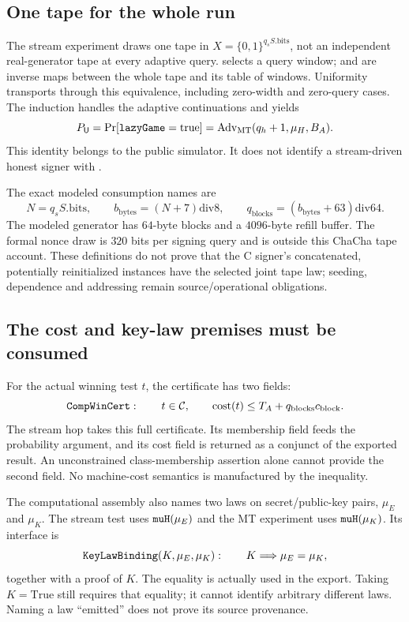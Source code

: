 \subsection{One tape for the whole run}
The stream experiment draws one tape in
$X=\{0,1\}^{q_s S.\mathrm{bits}}$, not an independent real-generator
tape at every adaptive query.  selects a query window;
 and  are inverse maps between
the whole tape and its table of windows. Uniformity transports through
this equivalence, including zero-width and zero-query cases.
The induction  handles the adaptive
continuations and yields
\[
 P_\U=\Pr[\code{lazyGame}=\mathrm{true}]
      =\Adv_{\mathrm{MT}}(q_h+1,\mu_H,B_A).
\]
This identity belongs to the public simulator. It does not identify
a stream-driven honest signer with .

The exact modeled consumption names are
\[
 N=q_s S.\mathrm{bits},\qquad
 b_{\mathrm{bytes}}=(N+7)\mathbin{\mathrm{div}}8,\qquad
 q_{\mathrm{blocks}}=(b_{\mathrm{bytes}}+63)\mathbin{\mathrm{div}}64.
\]
The modeled generator has $64$-byte blocks and a $4096$-byte refill
buffer. The formal nonce draw is $320$ bits per signing query and is
outside this ChaCha tape account. These definitions do not prove that
the C signer's concatenated, potentially reinitialized instances have
the selected joint tape law; seeding, dependence and addressing remain
source/operational obligations.

\subsection{The cost and key-law premises must be consumed}
For the actual winning test $t$, the certificate has two fields:
\begin{equation}\label{eq:cost}
 \code{CompWinCert}:\qquad t\in\mathcal C,\qquad
 \operatorname{cost}(t)\leq T_A+q_{\mathrm{blocks}}c_{\mathrm{block}}.
\end{equation}
The stream hop takes this full certificate. Its membership field feeds
the probability argument, and its cost field is returned as a
conjunct of the exported result. An unconstrained class-membership
assertion alone cannot provide the second field. No machine-cost
semantics is manufactured by the inequality.

The computational assembly also names two laws on secret/public-key
pairs, $\mu_E$ and $\mu_K$. The stream test uses
$\code{muH}(\mu_E)$ and the MT experiment uses $\code{muH}(\mu_K)$.
Its interface is
\[
 \code{KeyLawBinding}(K,\mu_E,\mu_K):\qquad K\Longrightarrow\mu_E=\mu_K,
\]
together with a proof of $K$. The equality is actually used in the
export. Taking $K=\mathrm{True}$ still requires that equality; it
cannot identify arbitrary different laws. Naming a law ``emitted''
does not prove its source provenance.

